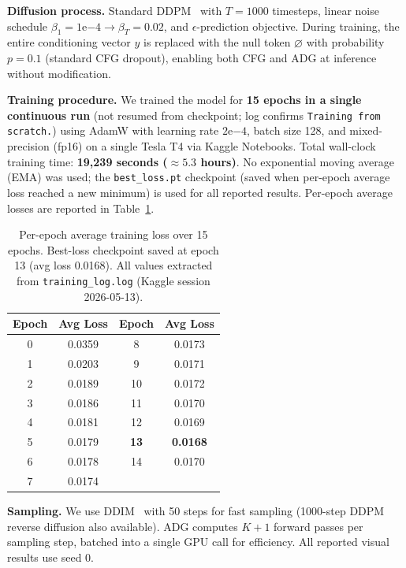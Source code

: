 \documentclass{article}
\begin{document}
\textbf{Diffusion process.} Standard DDPM~\citep{ho2020ddpm} with $T{=}1000$ timesteps, linear noise schedule $\beta_1{=}1\mathrm{e}{-4} \to \beta_T{=}0.02$, and $\epsilon$-prediction objective. During training, the entire conditioning vector $y$ is replaced with the null token $\varnothing$ with probability $p{=}0.1$ (standard CFG dropout), enabling both CFG and ADG at inference without modification.

\textbf{Training procedure.} We trained the model for \textbf{15 epochs in a single continuous run} (not resumed from checkpoint; log confirms \texttt{\small Training from scratch.}) using AdamW with learning rate $2\mathrm{e}{-4}$, batch size 128, and mixed-precision (fp16) on a single Tesla T4 via Kaggle Notebooks. Total wall-clock training time: \textbf{19,239 seconds (${\approx}5.3$ hours)}. No exponential moving average (EMA) was used; the \texttt{best\_loss.pt} checkpoint (saved when per-epoch average loss reached a new minimum) is used for all reported results. Per-epoch average losses are reported in Table~\ref{tab:training}.

\begin{table}[h]
\centering
\caption{Per-epoch average training loss over 15 epochs. Best-loss checkpoint saved at epoch 13 (avg loss 0.0168). All values extracted from \texttt{training\_log.log} (Kaggle session 2026-05-13).}
\label{tab:training}
\vspace{4pt}
\begin{tabular}{cccc}
\toprule
Epoch & Avg Loss & Epoch & Avg Loss \\
\midrule
0  & 0.0359 & 8  & 0.0173 \\
1  & 0.0203 & 9  & 0.0171 \\
2  & 0.0189 & 10 & 0.0172 \\
3  & 0.0186 & 11 & 0.0170 \\
4  & 0.0181 & 12 & 0.0169 \\
5  & 0.0179 & \textbf{13} & \textbf{0.0168} \\
6  & 0.0178 & 14 & 0.0170 \\
7  & 0.0174 & & \\
\bottomrule
\end{tabular}
\end{table}

\textbf{Sampling.} We use DDIM~\citep{ho2020ddpm} with 50 steps for fast sampling (1000-step DDPM reverse diffusion also available). ADG computes $K{+}1$ forward passes per sampling step, batched into a single GPU call for efficiency. All reported visual results use seed 0.
\end{document}
